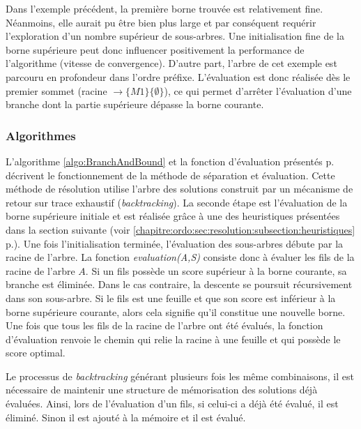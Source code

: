 

Dans l'exemple précédent, la première borne trouvée est relativement fine. Néanmoins, elle aurait pu être bien plus large et par conséquent requérir l'exploration d'un nombre supérieur de sous-arbres. Une initialisation fine de la borne supérieure peut donc influencer positivement la performance de l'algorithme (vitesse de convergence). D'autre part, l'arbre de cet exemple est parcouru en profondeur dans l'ordre préfixe. L'évaluation est donc réalisée dès le premier sommet (racine $\rightarrow \{M1\}\{\emptyset\}$), ce qui permet d'arrêter l'évaluation d'une branche dont la partie supérieure dépasse la borne courante.  

\FloatBarrier

\subsubsection{Algorithmes}

L'algorithme \ref{algo:BranchAndBound} et la fonction d'évaluation présentés p.\pageref{algo:func:evaluationBranchAndBound} décrivent le fonctionnement de la méthode de séparation et évaluation. Cette méthode de résolution utilise l'arbre des solutions construit par un mécanisme de retour sur trace exhaustif (\textit{backtracking}). La seconde étape est l'évaluation de la borne supérieure initiale et est réalisée grâce à une des heuristiques présentées dans la section suivante (voir \ref{chapitre:ordo:sec:resolution:subsection:heuristiques} p.\pageref{chapitre:ordo:sec:resolution:subsection:heuristiques}). Une fois l'initialisation terminée, l'évaluation des sous-arbres débute par la racine de l'arbre. La fonction \textit{evaluation(A,S)} consiste donc à évaluer les fils de la racine de l'arbre $A$. Si un fils possède un score supérieur à la borne courante, sa branche est éliminée. Dans le cas contraire, la descente se poursuit récursivement dans son sous-arbre. Si le fils est une feuille et que son score 
est inférieur à la borne 
supérieure courante, alors cela signifie qu'il constitue une nouvelle borne. Une fois que tous les fils de la racine de l'arbre ont été évalués, la fonction d'évaluation renvoie le chemin qui relie la racine à une feuille et qui possède le score optimal.

Le processus de \textit{backtracking} générant plusieurs fois les même combinaisons, il est nécessaire de maintenir une structure de mémorisation des solutions déjà évaluées. Ainsi, lors de l'évaluation d'un fils, si celui-ci a déjà été évalué, il est éliminé. Sinon il est ajouté à la mémoire et il est évalué.

